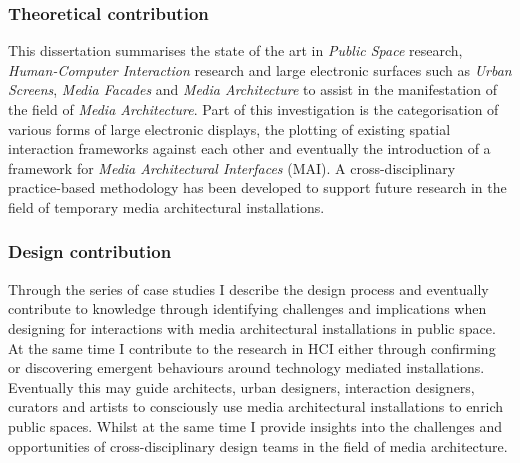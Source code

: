 \subsubsection*{Theoretical contribution}
This dissertation summarises the state of the art in \textit{Public Space} research, \textit{Human-Computer Interaction} research and large electronic surfaces such as \textit{Urban Screens}, \textit{Media Facades} and \textit{Media Architecture} to assist in the manifestation of the field of \textit{Media Architecture}.
Part of this investigation is the categorisation of various forms of large electronic displays, the plotting of existing spatial interaction frameworks against each other and eventually the introduction of a framework for \textit{Media Architectural Interfaces} (MAI). 
A cross-disciplinary practice-based methodology has been developed to support future research in the field of temporary media architectural installations. 

\subsubsection*{Design contribution}
Through the series of case studies I describe the design process and eventually contribute to knowledge through identifying challenges and implications when designing for interactions with media architectural installations in public space. 
At the same time I contribute to the research in HCI either through confirming or  discovering emergent behaviours around technology mediated installations.
Eventually this may guide architects, urban designers, interaction designers, curators and artists to consciously use media architectural installations to enrich public spaces.
Whilst at the same time I provide insights into the challenges and opportunities of cross-disciplinary design teams in the field of media architecture.

